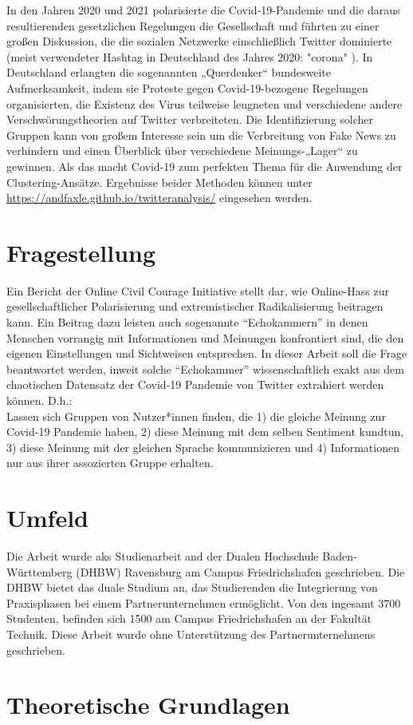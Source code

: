 In den Jahren 2020 und 2021 polarisierte die Covid-19-Pandemie und die daraus resultierenden gesetzlichen Regelungen die Gesellschaft und führten zu einer großen Diskussion, die die sozialen Netzwerke einschließlich Twitter dominierte (meist verwendeter Hashtag in Deutschland des Jahres 2020: "corona"  \cite{top-hashtags-de}).
In Deutschland erlangten die sogenannten „Querdenker“ bundesweite Aufmerksamkeit, indem sie Proteste gegen Covid-19-bezogene Regelungen organisierten, die Existenz des Virus teilweise leugneten und verschiedene andere Verschwörungstheorien auf Twitter verbreiteten.
Die Identifizierung solcher Gruppen kann von großem Interesse sein um die Verbreitung von Fake News zu verhindern und einen Überblick über verschiedene Meinungs-„Lager“ zu gewinnen. Als das macht Covid-19 zum perfekten Thema für die Anwendung der Clustering-Ansätze.
Ergebnisse beider Methoden können unter \url{https://andfaxle.github.io/twitteranalysis/} eingesehen werden.
\section{Fragestellung}
\label{sec:fragestellung}
Ein Bericht der Online Civil Courage Initiative stellt dar, wie Online-Hass zur gesellschaftlicher Polarisierung und extremistischer Radikalisierung beitragen kann.
Ein Beitrag dazu leisten auch sogenannte "`Echokammern"' in denen Menschen vorrangig mit Informationen und Meinungen konfrontiert sind, die den eigenen Einstellungen und Sichtweisen entsprechen. \cite{hassrede} In dieser Arbeit soll die Frage beantwortet werden, inweit solche "`Echokammer"' wissenschaftlich exakt aus dem chaotischen Datensatz der Covid-19 Pandemie von Twitter extrahiert werden können. D.h.:\\
Lassen sich Gruppen von Nutzer*innen finden, die 1) die gleiche Meinung zur Covid-19 Pandemie haben, 2) diese Meinung mit dem selben Sentiment kundtun, 3) diese Meinung mit der gleichen Sprache kommunizieren und 4) Informationen nur aus ihrer assozierten Gruppe erhalten.
\section{Umfeld}
\label{sec:umfeld}
Die Arbeit wurde aks Studienarbeit and der Dualen Hochschule Baden-Württemberg (DHBW) Ravensburg am Campus Friedrichshafen geschrieben. Die DHBW bietet das duale Studium an, das Studierenden die Integrierung von Praxisphasen bei einem Partnerunternehmen ermöglicht. Von den ingesamt 3700 Studenten, befinden sich 1500 am Campus Friedrichshafen an der Fakultät Technik.
Diese Arbeit wurde ohne Unterstützung des Partnerunternehmens geschrieben.
\section{Theoretische Grundlagen}
\label{sec:grundlagen}
